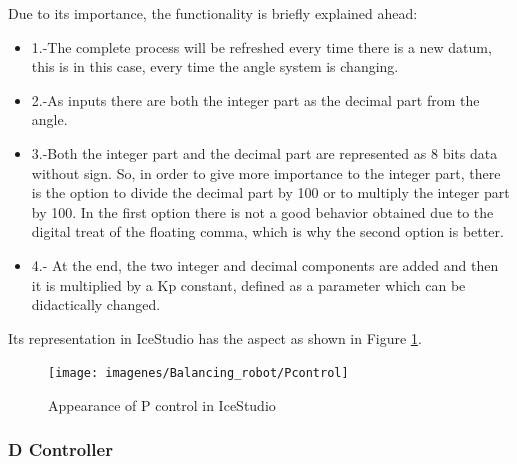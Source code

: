 Due to its importance, the functionality is briefly explained ahead:

\begin{itemize}
	\item 1.-The complete process will be refreshed every time there is a new datum, this is in this case, every time the angle system is changing.
	\item 2.-As inputs there are both the integer part as the decimal part from the angle.
	\item 3.-Both the integer part and the decimal part are represented as 8 bits data without sign. So, in order to give more importance to the integer part, there is the option to divide the decimal part by 100 or to multiply the integer part by 100. In the first option there is not a good behavior obtained due to the digital treat of the floating comma, which is why the second option is better.
	\item 4.- At the end, the two integer and decimal components are added and then it is multiplied by a Kp constant, defined as a parameter which can be didactically changed.
\end{itemize}

Its representation in IceStudio has the aspect as shown in Figure \ref{fig:Pcontrol}.

\begin{figure}[H]
	\center
	\texttt{[image: imagenes/Balancing\_robot/Pcontrol]}
	\caption{Appearance of P control in IceStudio}
	\label{fig:Pcontrol}
\end{figure}
\newpage
\subsubsection{D Controller} \label{sec:ControladorD}

